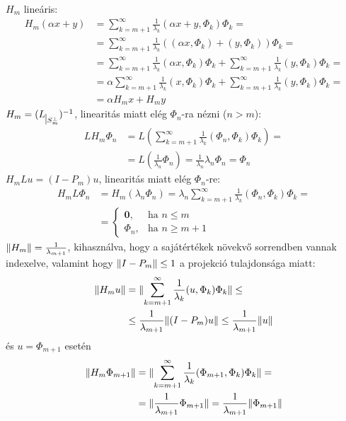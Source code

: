 \documentclass[oneside, titlepage, 12pt, a4paper]{report}
\DeclarePairedDelimiter\norm{\lVert}{\rVert}	%
\begin{document}
$H_m$ lineáris:
\begin{align*}
H_m(\alpha x + y) &= \sum_{k = m+1}^\infty \frac{1}{\lambda_k} (\alpha x + y, \Phi_k) \Phi_k = \\
 &= \sum_{k = m+1}^\infty \frac{1}{\lambda_k} ((\alpha x, \Phi_k) + (y, \Phi_k)) \Phi_k = \\
 &= \sum_{k = m+1}^\infty \frac{1}{\lambda_k} (\alpha x, \Phi_k) \Phi_k + \sum_{k = m+1}^\infty \frac{1}{\lambda_k} (y, \Phi_k) \Phi_k = \\
 &= \alpha \sum_{k = m+1}^\infty \frac{1}{\lambda_k} (x, \Phi_k) \Phi_k + \sum_{k = m+1}^\infty \frac{1}{\lambda_k} (y, \Phi_k) \Phi_k = \\
 &= \alpha H_m x + H_m y
\end{align*}
$H_m = (L_{\mkern 1mu \vrule height 2ex\mkern2mu S_m^\perp})^{-1}$, linearitás miatt elég $\Phi_n$-ra nézni ($n > m$):
\begin{align*}
L H_m \Phi_n &= L \left( \sum_{k = m+1}^\infty \frac{1}{\lambda_k} (\Phi_n, \Phi_k) \Phi_k \right) = \\
 &= L \left( \frac{1}{\lambda_n} \Phi_n \right) = \frac{1}{\lambda_n} \lambda_n \Phi_n = \Phi_n
\end{align*}
$H_m L u = (I - P_m)u$, linearitás miatt elég $\Phi_n$-re:
\begin{align*}
H_m L \Phi_n &= H_m (\lambda_n \Phi_n) = \lambda_n \sum_{k = m+1}^\infty \frac{1}{\lambda_k} (\Phi_n, \Phi_k) \Phi_k = \\
 &=
	\begin{cases}
		\mathbf{0}, &\text{ha } n \leq m \\
		\Phi_n, &\text{ha } n \geq m + 1
	\end{cases}
\end{align*}
$\norm{H_m} = \frac{1}{\lambda_{m+1}}$, kihasználva, hogy a sajátértékek növekvő sorrendben vannak indexelve, valamint hogy $\norm{I - P_m} \leq 1$ a projekció tulajdonsága miatt:
\begin{align*}
\norm{H_m u} &= \norm{ \sum_{k = m+1}^\infty \frac{1}{\lambda_k} (u, \Phi_k) \Phi_k} \leq \\
 &\leq \frac{1}{\lambda_{m+1}} \norm{(I - P_m)u} \leq \frac{1}{\lambda_{m+1}} \norm{u}
\end{align*}
és $u = \Phi_{m+1}$ esetén
\begin{align*}
\norm{H_m \Phi_{m+1}} &= \norm{ \sum_{k = m+1}^\infty \frac{1}{\lambda_k} (\Phi_{m+1}, \Phi_k) \Phi_k} = \\
 &= \norm{ \frac{1}{\lambda_{m+1}} \Phi_{m+1}} = \frac{1}{\lambda_{m+1}} \norm{\Phi_{m+1}}
\end{align*}
\end{document}
